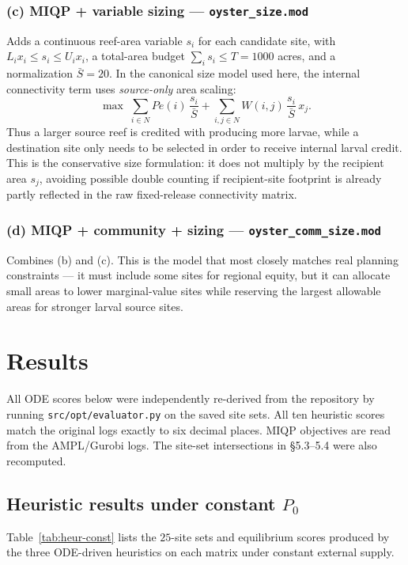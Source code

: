 \documentclass[11pt]{article}
\begin{document}
\subsubsection*{(c) MIQP + variable sizing --- \texttt{oyster\_size.mod}}
Adds a continuous reef-area variable $s_i$ for each candidate site, with
$L_i x_i \leq s_i \leq U_i x_i$, a total-area budget $\sum_i s_i \leq T=1000$ acres,
and a normalization $\bar{S}=20$. In the canonical size model used here, the
internal connectivity term uses \emph{source-only} area scaling:
\[
\max \; \sum_{i\in N} Pe(i)\,\frac{s_i}{\bar{S}}
      + \sum_{i,j\in N} W(i,j)\,\frac{s_i}{\bar{S}}\,x_j .
\]
Thus a larger source reef is credited with producing more larvae, while a
destination site only needs to be selected in order to receive internal larval
credit. This is the conservative size formulation: it does not multiply by the
recipient area $s_j$, avoiding possible double counting if recipient-site
footprint is already partly reflected in the raw fixed-release connectivity
matrix.

\subsubsection*{(d) MIQP + community + sizing --- \texttt{oyster\_comm\_size.mod}}
Combines (b) and (c). This is the model that most closely matches real planning constraints --- it must include some sites for regional equity, but it can allocate small areas to lower marginal-value sites while reserving the largest allowable areas for stronger larval source sites.

\section{Results}

All ODE scores below were independently re-derived from the repository by running \texttt{src/opt/evaluator.py} on the saved site sets. All ten heuristic scores match the original logs exactly to six decimal places. MIQP objectives are read from the AMPL/Gurobi logs. The site-set intersections in \S5.3--5.4 were also recomputed.

\subsection{Heuristic results under constant \texorpdfstring{$P_0$}{P0}}

Table~\ref{tab:heur-const} lists the $25$-site sets and equilibrium scores produced by the three ODE-driven heuristics on each matrix under constant external supply.
\end{document}
